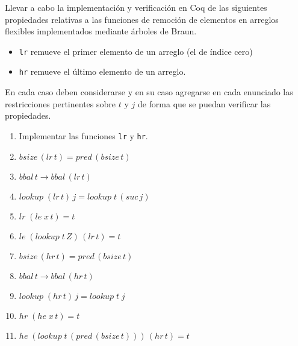 \documentclass[letterpaper, 11 pt]{article}
\begin{document}
Llevar a cabo la implementación y verificación en Coq de las siguientes propiedades relativas a las funciones de remoción de elementos en arreglos flexibles implementados mediante árboles de Braun.
\begin{itemize}
\item {\tt lr} remueve el primer elemento de un arreglo (el de índice cero)
\item {\tt hr} remueve el último elemento de un arreglo.
\end{itemize}
En cada caso deben considerarse y en su caso agregarse en
cada enunciado las restricciones pertinentes sobre $t$ y $j$ de forma que se puedan verificar las propiedades.
\begin{enumerate}
\item Implementar las funciones {\tt lr} y {\tt hr}.
\item $bsize\,(lr\,t) = pred\,(bsize\,t)$
\item $bbal\,t \to bbal\,(lr\,t)$
\item $lookup\;(lr\,t)\,j = lookup\;t\,(suc\,j)$
\item $lr\;(le\; x\, t) = t$
\item $le\;(lookup\; t\, Z)\, (lr\, t) = t$
\item $bsize\,(hr\,t) = pred\,(bsize\,t)$
\item $bbal\,t \to bbal\,(hr\,t)$
\item $lookup\;(hr\,t)\,j = lookup\;t\;j$
\item $hr\;(he\; x\, t) = t$
\item $he\;(lookup\; t\, (pred\,(bsize\,t)))\, (hr\, t) = t$  
  
\end{enumerate}







\end{document}
